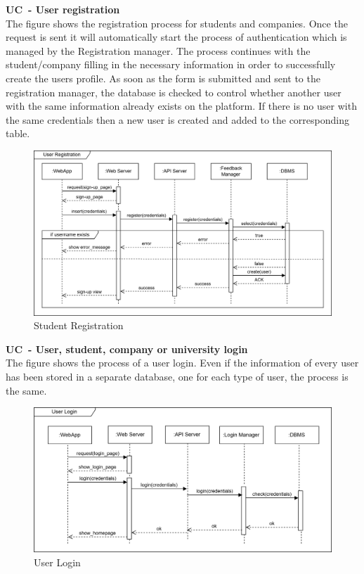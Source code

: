 \textbf{UC\cuc\  - User registration} \\
The figure shows the registration process for students and companies. Once the request is sent it will automatically start the process of authentication which is managed by the Registration manager. The process continues with the student/company filling in the necessary information in order to successfully create the users profile. As soon as the form is submitted and sent to the registration manager, the database is checked to control whether another user with the same information already exists on the platform. If there is no user with the same credentials then a new user is created and added to the corresponding table.
\begin{center}
    \begin{figure}[H]
        \centering
        \includegraphics[width=1\linewidth]{Images/Sequence diagrams/UC1.png}
        \caption{Student Registration}
        \label{fig:enter-label}
    \end{figure}
\end{center}

\textbf{UC\cuc\  - User, student, company or university login} \\
The figure shows the process of a user login. Even if the information of every user has been stored in a separate database, one for each type of user, the process is the same.
\begin{center}
    \begin{figure}[H]
        \centering
        \includegraphics[width=1\linewidth]{Images/Sequence diagrams/UC2.png}
        \caption{User Login}
        \label{fig:enter-label}
    \end{figure}
\end{center}
    


